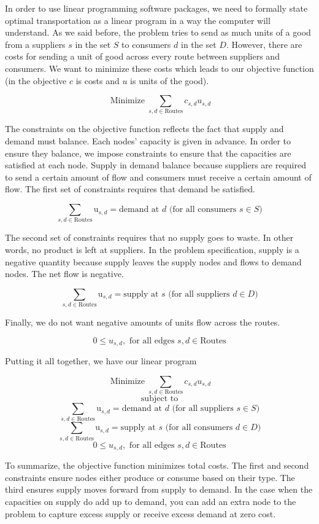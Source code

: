 \documentclass{report}
\begin{document}
In order to use linear programming software packages, we need to formally state optimal transportation as a linear program in a way the computer will understand. As we said before, the problem tries to send as much units of a good from a suppliers $s$ in the set $S$ to consumers $d$ in the set $D$. However, there are costs for sending a unit of good across every route between suppliers and consumers. We want to minimize these costs which leads to our objective function (in the objective $c$ is costs and $u$ is units of the good). 

$$\operatorname{Minimize} \sum_{s,d \in \text{Routes}} c_{s,d} u_{s,d}$$

The constraints on the objective function reflects the fact that supply and demand must balance. Each nodes' capacity is given in advance. In order to ensure they balance, we impose constraints to ensure that the capacities are satisfied at each node. Supply in demand balance because suppliers are required to send a certain amount of flow and consumers must receive a certain amount of flow. The first set of constraints requires that demand be satisfied.

$$\sum_{s,d \in \text{Routes}} \text{u}_{s,d}= \text{demand at } d \text{ (for all consumers } s \in S)$$

The second set of constraints requires that no supply goes to waste. In other words, no product is left at suppliers. In the problem specification, supply is a negative quantity because supply leaves the supply nodes and flows to demand nodes. The net flow is negative.

$$\sum_{s,d \in \text{Routes}} \text{u}_{s,d}= \text{supply at } s \text{ (for all suppliers } d \in D)$$

Finally, we do not want negative amounts of units flow across the routes.

$$0 \leq u_{s,d},  \text{ for all edges } s,d \in \text{Routes}$$

Putting it all together, we have our linear program

$$\operatorname{Minimize} \sum_{s,d \in \text{Routes}} c_{s,d} u_{s,d}$$
$$\text{subject to}$$
$$\sum_{s,d \in \text{Routes}} \text{u}_{s,d}= \text{demand at } d \text{ (for all suppliers } s \in S)$$
$$\sum_{s,d \in \text{Routes}} \text{u}_{s,d}= \text{supply at } s \text{ (for all consumers } d \in D)$$
$$0 \leq u_{s,d}, \text{ for all edges } s,d \in \text{Routes}$$

To summarize, the objective function minimizes total costs. The first and second constraints ensure nodes either produce or consume based on their type. The third ensures supply moves forward from supply to demand.  In the case when the capacities on supply do add up to demand, you can add an extra node to the problem to capture excess supply or receive excess demand at zero cost.
\end{document}
